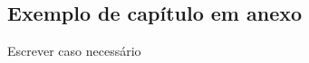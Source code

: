 \documentclass[
	12pt,				%
	openright,			%
	oneside,			%
	a4paper,			%
	english,			%
	french,				%
	spanish,			%
	brazil,				%
	]{abntex2}
\begin{document}

\begin{anexosenv}

\partanexos

\chapter{Exemplo de capítulo em anexo}
Escrever caso necessário

\end{anexosenv}
\end{document}

